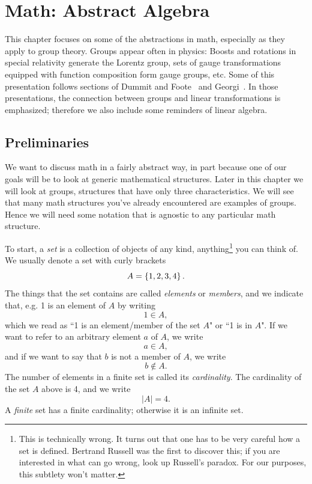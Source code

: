 \chapter{Math: Abstract Algebra}\label{ch:group}
This chapter focuses on some of the abstractions in math, especially
as they apply to group theory. 
Groups appear often in physics:
Boosts and rotations in special relativity 
generate the Lorentz group, sets of gauge transformations equipped with 
function composition form gauge groups, etc. Some of this presentation
follows sections of Dummit and Foote~\cite{dummit_abstract_2004} and 
Georgi~\cite{georgi_lie_1999}.
In those presentations, the connection between groups and linear
transformations is emphasized; therefore we also include
some reminders of linear algebra.


\section{Preliminaries}


We want to discuss math in a fairly abstract way, in part because one of our
goals will be to look at generic mathematical structures. Later in this chapter
we will look at groups, structures that have only three characteristics. We will
see that many math structures you've already encountered are examples of
groups.
Hence we will need some notation that is agnostic to any particular math
structure.


To start, a {\it set} is a collection of objects of
any kind, anything\footnote{This is technically wrong. It turns out that one has
to be very careful how a set is defined. Bertrand Russell was the first to
discover this; if you are interested in what can go wrong, look up
Russell's
paradox. For our purposes, this subtlety won't matter.}
you can think of. We usually denote a set
with curly brackets
\begin{equation}
A=\left\{1,2,3,4\right\}.
\end{equation}
The things that the set contains are called {\it elements}
or {\it members}, and we indicate that, e.g. 1 is an element of
$A$ by writing
\begin{equation}
1\in A,
\end{equation}
which we read as ``1 is an element/member of the set $A$" or ``1 is in $A$".
If we want to refer to an arbitrary element $a$ of $A$, we write
\begin{equation}
a\in A,
\end{equation}
and if we want to say that $b$ is not a member of $A$, we write
\begin{equation}
b\notin A.
\end{equation}
The number of elements in a finite set is called its {\it cardinality}. The cardinality of the set $A$ above is 4, and we write
\begin{equation}
  |A|=4.
\end{equation}
A {\it finite} set has a finite cardinality; otherwise it is an infinite set.


